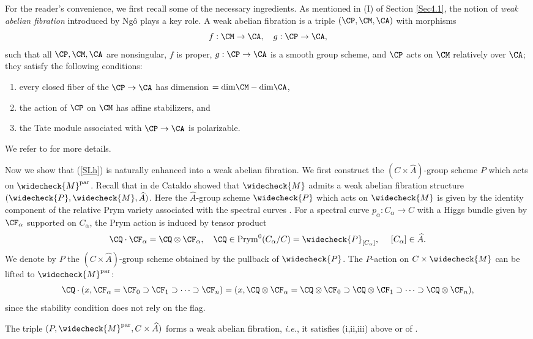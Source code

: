 For the reader's convenience, we first recall some of the necessary ingredients. As mentioned in (I) of Section \ref{Sec4.1}, the notion of \emph{weak abelian fibration} introduced by Ng\^o \cite{Ngo} plays a key role. A weak abelian fibration is a triple $(\CP, \CM, \CA)$ with morphisms
\[
f: \CM\to \CA, \quad g: \CP \to \CA,
\]
such that all $\CP, \CM, \CA$ are nonsingular, $f$ is proper, $g: \CP \to \CA$ is a smooth group scheme, and $\CP$ acts on $\CM$ relatively over $\CA$; they satisfy the following conditions:
\begin{enumerate}
    \item[(i)] every closed fiber of the $\CP \to \CA$ has dimension $= \mathrm{dim}\CM - \mathrm{dim}\CA$,
    \item[(ii)] the action of $\CP$ on $\CM$ has affine stabilizers, and
    \item[(iii)] the Tate module associated with $\CP \to \CA$ is polarizable.
\end{enumerate}
We refer to \cite[Section 1.1]{MS2} for more details.

Now we show that (\ref{SLh}) is naturally enhanced into a weak abelian fibration. We first construct the $(C\times \widehat{A})$-group scheme $P$ which acts on $\widecheck{M}^{\mathrm{par}}$. Recall that in \cite{dC_SL} de Cataldo showed that $\widecheck{M}$ admits a weak abelian fibration structure $(\widecheck{P}, \widecheck{M}, \widehat{A})$. Here the $\widehat{A}$-group scheme $\widecheck{P}$ which acts on $\widecheck{M}$ is given by the identity component of the relative Prym variety associated with the spectral curves \cite[(43)]{dC_SL}. For a spectral curve $p_\alpha: C_\alpha \to C$ with a Higgs bundle given by $\CF_\alpha$ supported on $C_\alpha$, the Prym action is induced by tensor product
\[
\CQ \cdot \CF_{\alpha} = \CQ \otimes \CF_\alpha, \quad \CQ \in \mathrm{Prym}^0(C_\alpha/C) = \widecheck{P}_{[C_\alpha]},~ \quad [C_\alpha] \in \widehat{A}.
\]
We denote by $P$ the $(C\times \widehat{A})$-group scheme obtained by the pullback of $\widecheck{P}$. The $P$-action on $C\times \widecheck{M}$ can be lifted to $\widecheck{M}^{\mathrm{par}}$:
\[
\CQ \cdot (x, \CF_\alpha = \CF_0 \supset \CF_1 \supset \cdots \supset \CF_n) =  (x, \CQ\otimes\CF_\alpha = \CQ \otimes \CF_0 \supset \CQ\otimes\CF_1 \supset \cdots \supset \CQ \otimes \CF_n),
\]
since the stability condition does not rely on the flag.


\begin{prop}
\notready\label{prop4.1}
The triple $(P, \widecheck{M}^{\mathrm{par}}, C\times \widehat{A})$ forms a weak abelian fibration, \emph{i.e.},  it satisfies (i,ii,iii) above or of \cite[Section 1.1]{MS2}.
\end{prop}

